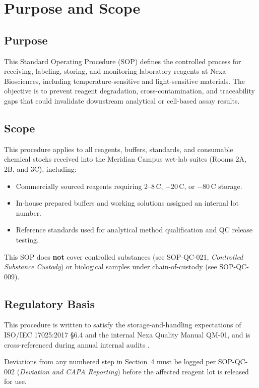 \section{Purpose and Scope}

\subsection{Purpose}
This Standard Operating Procedure (SOP) defines the controlled process for receiving,
labeling, storing, and monitoring laboratory reagents at Nexa Biosciences, including
temperature-sensitive and light-sensitive materials. The objective is to prevent reagent
degradation, cross-contamination, and traceability gaps that could invalidate downstream
analytical or cell-based assay results.

\subsection{Scope}
This procedure applies to all reagents, buffers, standards, and consumable chemical stocks
received into the Meridian Campus wet-lab suites (Rooms 2A, 2B, and 3C), including:
\begin{itemize}
  \item Commercially sourced reagents requiring 2--8\,\textdegree C, $-20$\,\textdegree C, or
        $-80$\,\textdegree C storage.
  \item In-house prepared buffers and working solutions assigned an internal lot number.
  \item Reference standards used for analytical method qualification and QC release testing.
\end{itemize}
This SOP does \textbf{not} cover controlled substances (see SOP-QC-021, \emph{Controlled
Substance Custody}) or biological samples under chain-of-custody (see SOP-QC-009).

\subsection{Regulatory Basis}
This procedure is written to satisfy the storage-and-handling expectations of ISO/IEC
17025:2017 \S 6.4 and the internal Nexa Quality Manual QM-01, and is cross-referenced during
annual internal audits \cite{iso17025}.

\begin{notebox}
Deviations from any numbered step in Section~4 must be logged per SOP-QC-002
(\emph{Deviation and CAPA Reporting}) before the affected reagent lot is released for use.
\end{notebox}
